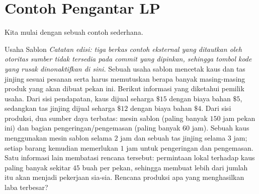\section{Contoh Pengantar LP}
\label{sec:lp-intro-example}
Kita mulai dengan sebuah contoh sederhana.
\begin{example}{Usaha Sablon}{}
\emph{Catatan edisi: tiga berkas contoh eksternal yang ditautkan oleh otoritas sumber tidak tersedia pada commit yang dipinkan, sehingga tombol kode yang rusak dinonaktifkan di sini.}
Sebuah usaha sablon mencetak kaus dan tas jinjing sesuai pesanan serta harus memutuskan berapa banyak masing-masing produk yang akan dibuat pekan ini. Berikut informasi yang diketahui pemilik usaha. Dari sisi pendapatan, kaus dijual seharga $\$15$ dengan biaya bahan $\$5$, sedangkan tas jinjing dijual seharga $\$12$ dengan biaya bahan $\$4$. Dari sisi produksi, dua sumber daya terbatas: mesin sablon (paling banyak $150$ jam pekan ini) dan bagian pengeringan/pengemasan (paling banyak $60$ jam). Sebuah kaus menggunakan mesin sablon selama $2$ jam dan sebuah tas jinjing selama $3$ jam; setiap barang kemudian memerlukan $1$ jam untuk pengeringan dan pengemasan. Satu informasi lain membatasi rencana tersebut: permintaan lokal terhadap kaus paling banyak sekitar $45$ buah per pekan, sehingga membuat lebih dari jumlah itu akan menjadi pekerjaan sia-sia. Rencana produksi apa yang menghasilkan laba terbesar?


\end{example}
